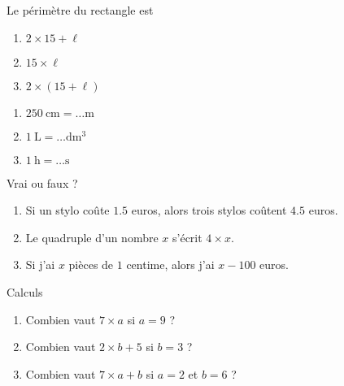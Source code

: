 
\begin{MentalActivity}
    \begin{mental}

        \begin{center}
   
        \end{center}
        
        Le périmètre du rectangle est
        \begin{enumerate}
            \item
                \( 2\times 15+\ell\)
            \item
                \( 15\times \ell\)
            \item
                \( 2\times (15+\ell)\)
        \end{enumerate}

    \end{mental}

    \begin{mental}
        \begin{enumerate}
            \item
                $\SI{250}{\centi\meter}=\ldots\si{\meter}$
            \item
                $\SI{1}{\liter}=\ldots\si{\deci\cubic\meter}$
            \item
                \( \SI{1}{\hour}=\ldots\si{\second}\)
        \end{enumerate}
    \end{mental}

    \begin{mental}
        Vrai ou faux ?
        \begin{enumerate}
            \item
                Si un stylo coûte \( 1.5\) euros, alors trois stylos coûtent \( 4.5\) euros.
            \item
                Le quadruple d'un nombre \( x\) s'écrit \( 4\times x\).
            \item
                Si j'ai \( x\) pièces de \( 1\) centime, alors j'ai \( x-100\) euros.
        \end{enumerate}
    \end{mental}

    \begin{mental}
        Calculs 
        \begin{enumerate}
            \item
                Combien vaut \( 7\times a\) si \( a=9\) ?
            \item
                Combien vaut \( 2\times b+5\) si \( b=3\) ?
            \item
                Combien vaut \( 7\times a+b\) si \( a=2\) et \( b=6\) ?
        \end{enumerate}
    \end{mental}


\end{MentalActivity}

